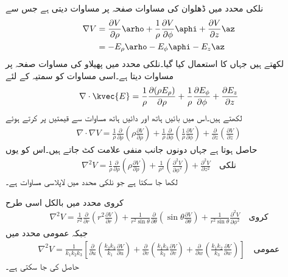 نلکی محدد میں ڈھلوان کی مساوات صفحہ  پر مساوات  دیتی ہے جس سے 
\begin{gather}
\begin{aligned}\label{مساوات_لاپلاس_نلکی_پھیلاو_الف}
\nabla V &= \frac{\partial V}{\partial \rho} \arho+\frac{1}{\rho}\frac{\partial V}{\partial \phi}  \aphi+\frac{\partial V}{\partial z}\az\\
&=-E_\rho \arho-E_\phi \aphi-E_z \az 
\end{aligned}
\end{gather}
لکھتے  ہیں جہاں  کا استعمال کیا گیا۔نلکی محدد میں پھیلاو کی مساوات صفحہ  پر مساوات  دیتا ہے۔اسی مساوات کو سمتیہ  کے لئے
 \begin{align*}
\nabla \cdot \kvec{E}=\frac{1}{\rho}\frac{\partial (\rho E_{\rho})}{\partial \rho}+\frac{1}{\rho}\frac{\partial E_{\phi}}{\partial \phi}  +  \frac{\partial E_{z}}{\partial z}
\end{align*}
لکھتے ہیں۔اس میں بائیں ہاتھ   اور دائیں ہاتھ مساوات  سے قیمتیں پر کرتے ہوئے
\begin{align*}
\nabla \cdot \nabla V=\frac{1}{\rho}\frac{\partial }{\partial \rho}\left(\rho \frac{\partial V}{\partial \rho}\right)
+\frac{1}{\rho}\frac{\partial }{\partial \phi}\left(\frac{1}{\rho}\frac{\partial V}{\partial \phi}  \right) 
+  \frac{\partial}{\partial z} \left(\frac{\partial V}{\partial z} \right)
\end{align*}
حاصل ہوتا ہے جہاں دونوں جانب منفی علامت کٹ جاتے ہیں۔اس کو یوں
\begin{align}
\nabla^2 V=\frac{1}{\rho}\frac{\partial }{\partial \rho}\left(\rho \frac{\partial V}{\partial \rho}\right)
+\frac{1}{\rho^2}\left(\frac{\partial^2 V}{\partial \phi^2}  \right) 
+  \frac{\partial^2 V}{\partial z^2}\quad {\textrm{نلکی}}
\end{align}
 لکھا جا سکتا ہے جو نلکی محدد میں لاپلاسی مساوات ہے۔

کروی محدد میں بالکل اسی طرح
\begin{align}\label{مساوات_لاپلاس_کروی_لاپلاسی}
\nabla^2 V=\frac{1}{r^2} \frac{\partial}{\partial r} \left(r^2\frac{\partial V}{\partial r} \right)+\frac{1}{r^2 \sin \theta} \frac{\partial}{\partial \theta} \left(\sin \theta \frac{\partial V}{\partial \theta}  \right)+\frac{1}{r^2 \sin \theta}\frac{\partial^2 V}{\partial \phi^2} \quad {\textrm{کروی}}
\end{align}
جبکہ عمومی محدد میں
\begin{align}\label{مساوات_لاپلاس_عمومی_لاپلاسی}
\nabla^2 V=\frac{1}{k_1 k_2 k_3}\left[\frac{\partial}{\partial u}\left(\frac{k_2 k_3}{k_1}\frac{\partial V}{\partial u} \right)+\frac{\partial}{\partial v}\left(\frac{k_1 k_3}{k_2}\frac{\partial V}{\partial v} \right) +\frac{\partial}{\partial w}\left(\frac{k_1 k_2}{k_3}\frac{\partial V}{\partial w} \right)\right] \quad{\textrm{عمومی}}
\end{align}
حاصل کی جا سکتی ہے۔

